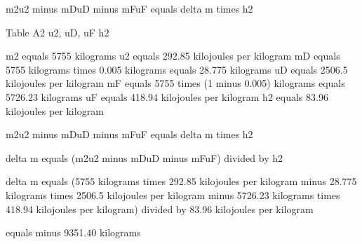 m2u2 minus mDuD minus mFuF equals delta m times h2  

Table A2  
u2, uD, uF  
h2  

m2 equals 5755 kilograms  
u2 equals 292.85 kilojoules per kilogram  
mD equals 5755 kilograms times 0.005 kilograms equals 28.775 kilograms  
uD equals 2506.5 kilojoules per kilogram  
mF equals 5755 times (1 minus 0.005) kilograms equals 5726.23 kilograms  
uF equals 418.94 kilojoules per kilogram  
h2 equals 83.96 kilojoules per kilogram  

m2u2 minus mDuD minus mFuF equals delta m times h2  

delta m equals (m2u2 minus mDuD minus mFuF) divided by h2  

delta m equals (5755 kilograms times 292.85 kilojoules per kilogram minus 28.775 kilograms times 2506.5 kilojoules per kilogram minus 5726.23 kilograms times 418.94 kilojoules per kilogram) divided by 83.96 kilojoules per kilogram  

equals minus 9351.40 kilograms